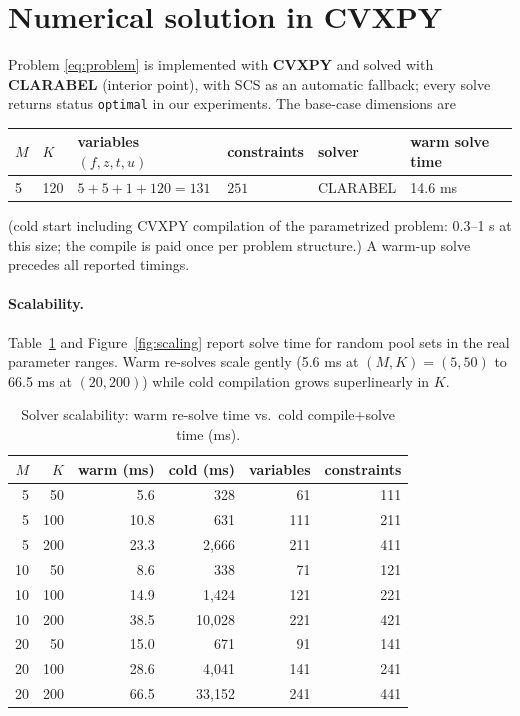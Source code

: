 \documentclass[11pt,a4paper]{article}
\theoremstyle{remark}
\newcommand{\code}[1]{\texttt{#1}}
\begin{document}
\section{Numerical solution in CVXPY}
\label{sec:numerics}

Problem \eqref{eq:problem} is implemented with \textbf{CVXPY} and solved with
\textbf{CLARABEL} (interior point), with SCS as an automatic fallback; every solve returns
status \code{optimal} in our experiments.  The base-case dimensions are

\begin{center}
\small
\begin{tabular}{@{}llllll@{}}
\toprule
$M$ & $K$ & variables $(f,z,t,u)$ & constraints & solver & warm solve time \\
\midrule
5 & 120 & $5+5+1+120 = 131$ & $251$ & CLARABEL & 14.6 ms \\
\bottomrule
\end{tabular}
\end{center}

\medskip
\noindent
(cold start including CVXPY compilation of the parametrized problem: 0.3--1 s at this size;
the compile is paid once per problem structure.)  A warm-up solve precedes all reported
timings.

\paragraph{Scalability.}
Table~\ref{tab:scaling} and Figure~\ref{fig:scaling} report solve time for random pool sets
in the real parameter ranges.  Warm re-solves scale gently (5.6 ms at $(M,K)=(5,50)$ to
66.5 ms at $(20,200)$) while cold compilation grows superlinearly in $K$.

\begin{table}[H]
\centering
\caption{Solver scalability: warm re-solve time vs.\ cold compile+solve time (ms).}
\label{tab:scaling}
\small
\begin{tabular}{@{}rrrrrr@{}}
\toprule
$M$ & $K$ & \textbf{warm (ms)} & \textbf{cold (ms)} & variables & constraints \\
\midrule
5 & 50  & 5.6  & 328   & 61  & 111 \\
5 & 100 & 10.8 & 631   & 111 & 211 \\
5 & 200 & 23.3 & 2{,}666 & 211 & 411 \\
10 & 50  & 8.6  & 338   & 71  & 121 \\
10 & 100 & 14.9 & 1{,}424 & 121 & 221 \\
10 & 200 & 38.5 & 10{,}028 & 221 & 421 \\
20 & 50  & 15.0 & 671   & 91  & 141 \\
20 & 100 & 28.6 & 4{,}041 & 141 & 241 \\
20 & 200 & 66.5 & 33{,}152 & 241 & 441 \\
\bottomrule
\end{tabular}
\end{table}
\end{document}
